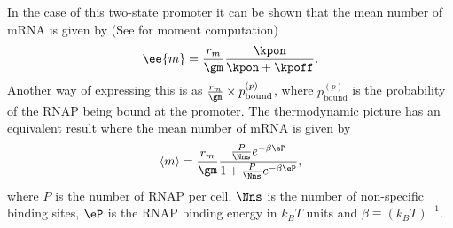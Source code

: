 In the case of this two-state promoter it can be shown that the mean number of
mRNA is given by \cite{Phillips2015} (See  for moment
computation)
\begin{equation}
  \ee{m} = {r_m \over \gm} {\kpon \over \kpon + \kpoff}.
  \label{seq_mean_kinetic}
\end{equation}
Another way of expressing this is as ${r_m \over \gm} \times
p_{\text{bound}}^{(p)}$, where $p_{\text{bound}}^{(p)}$ is the probability of
the RNAP being bound at the promoter. The thermodynamic picture has an
equivalent result where the mean number of mRNA is given by \cite{Brewster2012,
Bintu2005a}
\begin{equation}
  \left\langle m \right\rangle = {r_m \over \gm}
  {{P \over \Nns} e^{-\beta\eP}
  \over 1 + {P \over \Nns} e^{-\beta\eP}},
  \label{seq_mean_thermo}
\end{equation}
where $P$ is the number of RNAP
per cell, $\Nns$ is the number of non-specific binding sites,
$\eP$ is the RNAP binding energy in $k_BT$ units and
$\beta\equiv {(k_BT)}^{-1}$.

